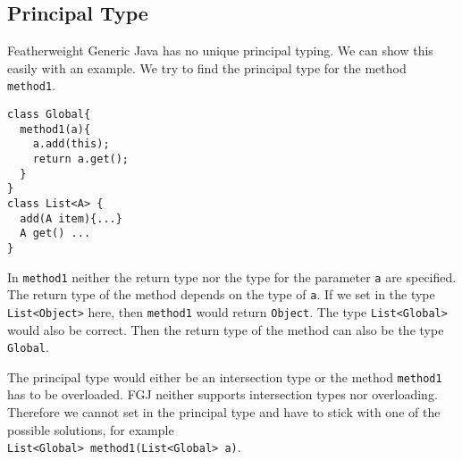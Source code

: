 \subsection{Principal Type}

  



Featherweight Generic Java has no unique principal typing.
We can show this easily with an example.
We try to find the principal type for the method \texttt{method1}.
\begin{lstlisting}
class Global{
  method1(a){
    a.add(this);
    return a.get();
  }
}
class List<A> {
  add(A item){...}
  A get() ...
}
\end{lstlisting}
In \texttt{method1} neither the return type nor the type for the parameter \texttt{a} are specified.
The return type of the method depends on the type of \texttt{a}.
If we set in the type \texttt{List<Object>} here, then \texttt{method1} would return \texttt{Object}.
The type \texttt{List<Global>} would also be correct.
Then the return type of the method can also be the type \texttt{Global}.

The principal type would either be an intersection type or the method \texttt{method1} has to be overloaded.
FGJ neither supports intersection types nor overloading.
Therefore we cannot set in the principal type and have to stick with one of the possible solutions,
for example\\
\texttt{List<Global> method1(List<Global> a)}.

